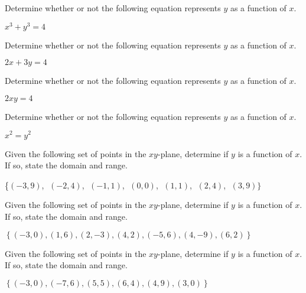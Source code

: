 \documentclass{ximera}
\begin{document}
\begin{problem}
Determine whether or not the following equation represents $y$ as a function of $x$.

$x^3 + y^3 = 4$
\end{problem}




\begin{problem}
Determine whether or not the following equation represents $y$ as a function of $x$.

$2x + 3y = 4$
\end{problem}

\begin{problem}
Determine whether or not the following equation represents $y$ as a function of $x$.

$2xy = 4$
\end{problem}

\begin{problem}\label{equfunctionlast}
Determine whether or not the following equation represents $y$ as a function of $x$.

$x^2 = y^2$
\end{problem}








\begin{problem}\label{setfunctionfirst}
  Given the following set of points in the $xy$-plane, determine if $y$ is a function of $x$.  If so, state the domain and range.  

\{$(-3, 9)$, $\;(-2, 4)$, $\;(-1, 1)$, $\;(0, 0)$, $\;(1, 1)$, $\;(2, 4)$, $\;(3, 9)\}$ 
\end{problem}

\begin{problem}
  Given the following set of points in the $xy$-plane, determine if $y$ is a function of $x$.  If so, state the domain and range.  

$\left\{ (-3,0), (1,6), (2,-3), (4,2), (-5,6), (4,-9), (6,2) \right\}$
\end{problem}    


\begin{problem}
  Given the following set of points in the $xy$-plane, determine if $y$ is a function of $x$.  If so, state the domain and range.  

$\left\{ (-3,0), (-7,6), (5,5), (6,4), (4,9), (3,0) \right\}$
\end{problem}    
\end{document}
